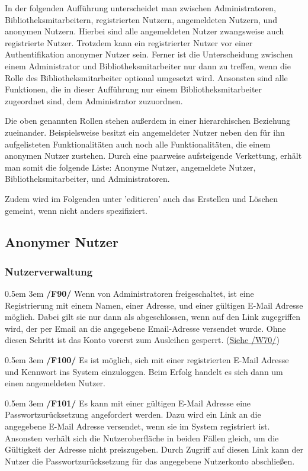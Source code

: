\documentclass{article}
\newcommand{\specification}[3]{
	{\parindent 0.5em \hangindent 3em \hypertarget{spec:#1:#2}{\textbf{/#1#2/}} #3 \par \nobreak \vspace*{0.5em}}
}
\begin{document}
In der folgenden Aufführung unterscheidet man zwischen Administratoren, Bibliotheksmitarbeitern, registrierten Nutzern, angemeldeten Nutzern, und anonymen Nutzern.
Hierbei sind alle angemeldeten Nutzer zwangsweise auch registrierte Nutzer. Trotzdem kann ein registrierter Nutzer vor einer Authentifikation anonymer Nutzer sein.
Ferner ist die Unterscheidung zwischen einem Administrator und Bibliotheksmitarbeiter nur dann zu treffen, wenn die Rolle des Bibliotheksmitarbeiter optional umgesetzt wird.
Ansonsten sind alle Funktionen, die in dieser Aufführung nur einem Bibliotheksmitarbeiter zugeordnet sind, dem Administrator zuzuordnen. \vspace{0.5em}

Die oben genannten Rollen stehen außerdem in einer hierarchischen Beziehung zueinander.
Beispielsweise besitzt ein angemeldeter Nutzer neben den für ihn aufgelisteten Funktionalitäten auch noch alle Funktionalitäten, die einem anonymen Nutzer zustehen.
Durch eine paarweise aufsteigende Verkettung, erhält man somit die folgende Liste: Anonyme Nutzer, angemeldete Nutzer, Bibliotheksmitarbeiter, und Administratoren. \vspace{0.5em}

Zudem wird im Folgenden unter 'editieren' auch das Erstellen und Löschen gemeint, wenn nicht anders spezifiziert. \vspace{0.5em}

\subsection{Anonymer Nutzer}
	\subsubsection{Nutzerverwaltung}
		\specification{F}{90}{Wenn von Administratoren freigeschaltet, ist eine Registrierung mit einem Namen, einer Adresse, und einer gültigen E-Mail Adresse möglich.
			Dabei gilt sie nur dann als abgeschlossen, wenn auf den Link zugegriffen wird, der per Email an die angegebene Email-Adresse versendet wurde.
			Ohne diesen Schritt ist das Konto vorerst zum Ausleihen gesperrt. (\hyperlink{spec:W:70}{Siehe /W70/}) }
		\specification{F}{100}{Es ist möglich, sich mit einer registrierten E-Mail Adresse und Kennwort ins System einzuloggen. Beim Erfolg handelt es sich dann um einen angemeldeten Nutzer. }
		\specification{F}{101}{Es kann mit einer gültigen E-Mail Adresse eine Passwortzurücksetzung angefordert werden.
			Dazu wird ein Link an die angegebene E-Mail Adresse versendet, wenn sie im System registriert ist. Ansonsten verhält sich die Nutzeroberfläche in beiden Fällen gleich, um die Gültigkeit der Adresse nicht preiszugeben.
			Durch Zugriff auf diesen Link kann der Nutzer die Passwortzurücksetzung für das angegebene Nutzerkonto abschließen. }
\end{document}
